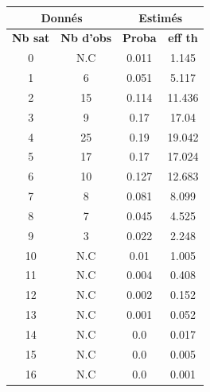 \begin{figure}[!h]
    \centering
    \begin{minipage}{.42\linewidth}
        \begin{center}
            \begin{tabular}{| c | c | c | c |}
                \hline
                \multicolumn{2}{|c|}{\textbf{Donnés}} & \multicolumn{2}{|c|}{\textbf{Estimés}} \\ \hline
                \textbf{Nb sat} & \textbf{Nb d'obs} & \textbf{Proba} & \textbf{eff th} \\ \hline\hline
                0 & N.C & 0.011 & 1.145 \\ \hline\hline
                1 & 6 & 0.051 & 5.117 \\ 
                2 & 15 & 0.114 & 11.436 \\ 
                3 & 9 & 0.17 & 17.04 \\ 
                4 & 25 & 0.19 & 19.042 \\
                5 & 17 & 0.17 & 17.024 \\ 
                6 & 10 & 0.127 & 12.683 \\ 
                7 & 8 & 0.081 & 8.099 \\ 
                8 & 7 & 0.045 & 4.525 \\ 
                9 & 3 & 0.022 & 2.248 \\ \hline\hline
                10 & N.C & 0.01 & 1.005 \\ 
                11 & N.C & 0.004 & 0.408 \\ 
                12 & N.C & 0.002 & 0.152 \\ 
                13 & N.C & 0.001 & 0.052 \\ 
                14 & N.C & 0.0 & 0.017 \\ 
                15 & N.C & 0.0 & 0.005 \\ 
                16 & N.C & 0.0 & 0.001 \\ \hline
            \end{tabular}
        \end{center}
    \end{minipage}\hfill
    \begin{minipage}{.54\linewidth}
        \begin{center}

\end{center}
\end{minipage}
\end{figure}

